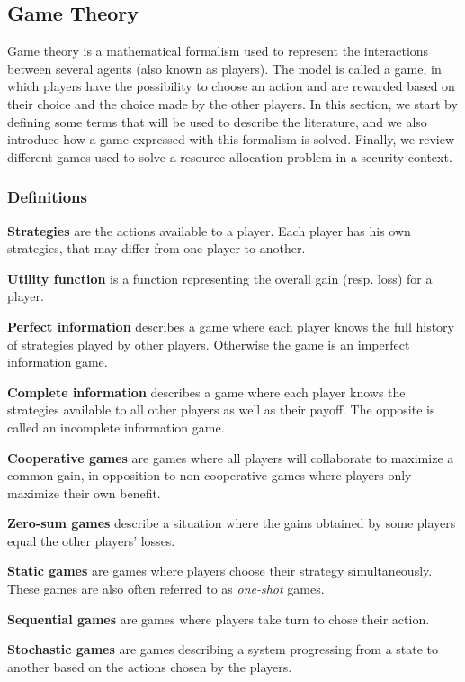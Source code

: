 \subsection{Game Theory}

Game theory is a mathematical formalism used to represent the interactions between several agents (also known as players).
The model is called a game, in which players have the possibility to choose an action and are rewarded based on their choice and the choice made by the other players.
In this section, we start by defining some terms that will be used to describe the literature, and we also introduce how a game expressed with this formalism is solved. Finally, we review different games used to solve a resource allocation problem in a security context.

\subsubsection{Definitions}

\textbf{Strategies} are the actions available to a player. Each player has his own strategies, that may differ from one player to another.

\textbf{Utility function} is a function representing the overall gain (resp. loss) for a player.

\textbf{Perfect information} describes a game where each player knows the full history of strategies played by other players. Otherwise the game is an imperfect information game.

\textbf{Complete information} describes a game where each player knows the strategies available to all other players as well as their payoff. The opposite is called an incomplete information game.

\textbf{Cooperative games} are games where all players will collaborate to maximize a common gain, in opposition to non-cooperative games where players only maximize their own benefit.

\textbf{Zero-sum games} describe a situation where the gains obtained by some players equal the other players' losses.

\textbf{Static games} are games where players choose their strategy simultaneously. These games are also often referred to as \textit{one-shot} games.

\textbf{Sequential games} are games where players take turn to chose their action.

\textbf{Stochastic games} are games describing a system progressing from a state to another based on the actions chosen by the players.


